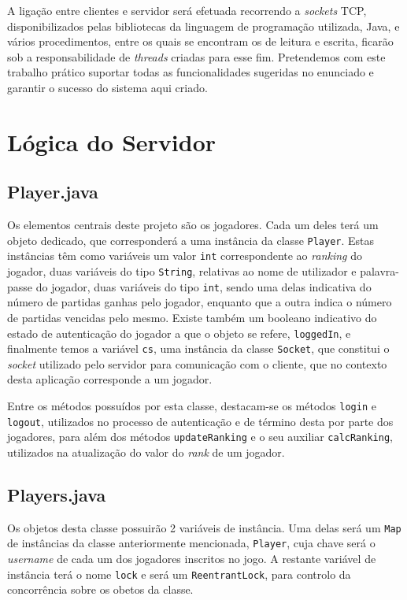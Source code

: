 \documentclass{llncs}
\begin{document}
A ligação entre clientes e servidor será efetuada recorrendo a \textit{sockets} TCP, 
disponibilizados pelas bibliotecas da linguagem de programação utilizada, Java, e 
vários procedimentos, entre os quais se encontram os de leitura e escrita, ficarão sob 
a responsabilidade de \textit{threads} criadas para esse fim. Pretendemos com este trabalho 
prático suportar todas as funcionalidades sugeridas no enunciado e garantir o 
sucesso do sistema aqui criado.

\section{Lógica do Servidor}

\subsection{Player.java}

Os elementos centrais deste projeto são os jogadores. Cada um deles terá um objeto dedicado, que 
corresponderá a uma instância da classe \texttt{Player}. Estas instâncias têm como variáveis um 
valor \texttt{int} correspondente ao \textit{ranking} do jogador, duas variáveis do tipo 
\texttt{String}, relativas ao nome de utilizador e palavra-passe do jogador, duas variáveis do 
tipo \texttt{int}, sendo uma delas indicativa do número de partidas ganhas pelo jogador, enquanto
que a outra indica o número de partidas vencidas pelo mesmo.  Existe também um booleano indicativo 
do estado de autenticação do jogador a que o objeto se refere, \texttt{loggedIn}, e finalmente temos 
a variável \texttt{cs}, uma instância da classe \texttt{Socket}, que constitui o \textit{socket} utilizado pelo 
servidor para comunicação com o cliente, que no contexto desta aplicação corresponde a um jogador.

Entre os métodos possuídos por esta classe, destacam-se os métodos \texttt{login} e \texttt{logout}, 
utilizados no processo de autenticação e de término desta por parte dos jogadores, para além dos métodos 
\texttt{updateRanking} e o seu auxiliar \texttt{calcRanking}, utilizados na atualização do valor do 
\textit{rank} de um jogador.

\subsection{Players.java}

Os objetos desta classe possuirão 2 variáveis de instância. Uma delas será um \texttt{Map} de instâncias 
da classe anteriormente mencionada, \texttt{Player}, cuja chave será o \textit{username} de cada um dos 
jogadores inscritos no jogo. A restante variável de instância terá o nome \texttt{lock} e será um 
\texttt{ReentrantLock}, para controlo da concorrência sobre os obetos da classe.
\end{document}
